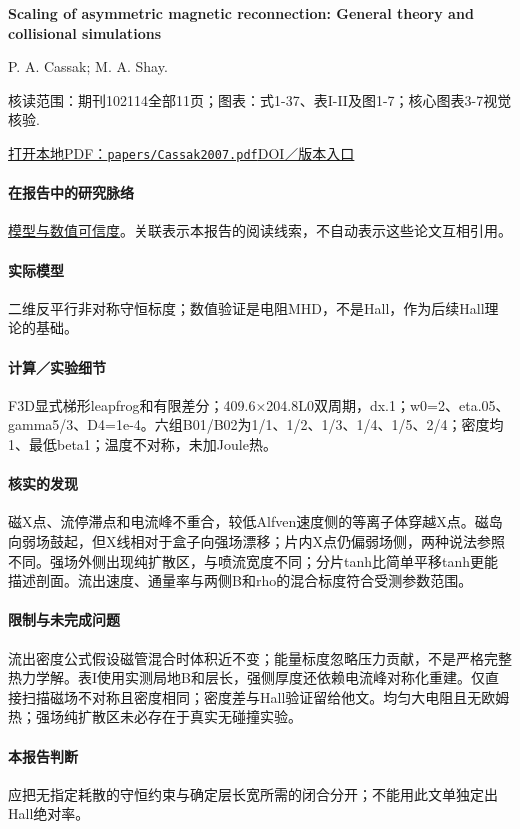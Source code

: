 \textbf{Scaling of asymmetric magnetic reconnection: General theory and collisional simulations}\citep{Cassak2007}\

P. A. Cassak;  M. A. Shay.

\textsf{核读范围：}期刊102114全部11页；\textsf{图表：}式1-37、表I-II及图1-7；核心图表3-7视觉核验.

\href{run:papers/Cassak2007.pdf}{打开本地PDF：\texttt{papers/Cassak2007.pdf}}\quad\href{https://doi.org/10.1063/1.2795630}{DOI／版本入口}

\paragraph{在报告中的研究脉络}\hyperref[ch:numerics]{模型与数值可信度}。关联表示本报告的阅读线索，不自动表示这些论文互相引用。

\paragraph{实际模型}二维反平行非对称守恒标度；数值验证是电阻MHD，不是Hall，作为后续Hall理论的基础。

\paragraph{计算／实验细节}F3D显式梯形leapfrog和有限差分；409.6×204.8L0双周期，dx.1；w0=2、eta.05、gamma5/3、D4=1e-4。六组B01/B02为1/1、1/2、1/3、1/4、1/5、2/4；密度均1、最低beta1；温度不对称，未加Joule热。

\paragraph{核实的发现}磁X点、流停滞点和电流峰不重合，较低Alfven速度侧的等离子体穿越X点。磁岛向弱场鼓起，但X线相对于盒子向强场漂移；片内X点仍偏弱场侧，两种说法参照不同。强场外侧出现纯扩散区，与喷流宽度不同；分片tanh比简单平移tanh更能描述剖面。流出速度、通量率与两侧B和rho的混合标度符合受测参数范围。

\paragraph{限制与未完成问题}流出密度公式假设磁管混合时体积近不变；能量标度忽略压力贡献，不是严格完整热力学解。表I使用实测局地B和层长，强侧厚度还依赖电流峰对称化重建。仅直接扫描磁场不对称且密度相同；密度差与Hall验证留给他文。均匀大电阻且无欧姆热；强场纯扩散区未必存在于真实无碰撞实验。

\paragraph{本报告判断}应把无指定耗散的守恒约束与确定层长宽所需的闭合分开；不能用此文单独定出Hall绝对率。

